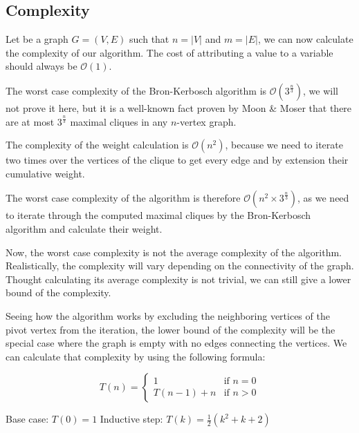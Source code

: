 \subsection{Complexity}

Let be a graph $G=(V,E)$ such that $n=|V|$ and $m=|E|$, we can now calculate the
complexity of our algorithm. The cost of attributing a value to a variable should
always be $\mathcal{O}(1)$. \newline

The worst case complexity of the Bron-Kerbosch algorithm is $\mathcal{O}(3^{\frac{n}{3}})$,
we will not prove it here, but it is a well-known fact proven by Moon \& Moser
\cite{on-cliques-in-graphs} that there are at most $3^{\frac{n}{3}}$ maximal cliques
in any $n$-vertex graph. \newline

The complexity of the weight calculation is $\mathcal{O}(n^2)$, because we need
to iterate two times over the vertices of the clique to get every edge and by
extension their cumulative weight. \newline

The worst case complexity of the algorithm is therefore $\mathcal{O}(n^2\times3^{\frac{n}{3}})$,
as we need to iterate through the computed maximal cliques by the Bron-Kerbosch
algorithm and calculate their weight. \newline

Now, the worst case complexity is not the average complexity of the algorithm.
Realistically, the complexity will vary depending on the connectivity of the
graph. Thought calculating its average complexity is not trivial, we can still
give a lower bound of the complexity. \newline

Seeing how the algorithm works by excluding the neighboring vertices of the pivot
vertex from the iteration, the lower bound of the complexity will be the special
case where the graph is empty with no edges connecting the vertices. We can
calculate that complexity by using the following formula:

\begin{equation}
    T(n)=\begin{cases}
        1        & \text{if } n=0 \\
        T(n-1)+n & \text{if } n>0
    \end{cases}
\end{equation}

Base case: $T(0)=1$ \newline
Inductive step: $T(k)=\frac{1}{2}(k^2+k+2)$

